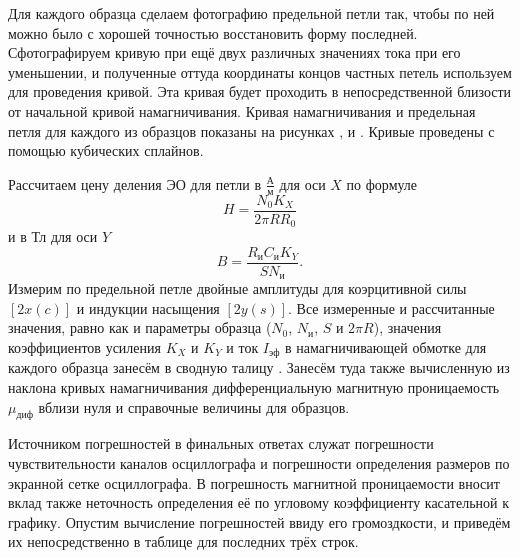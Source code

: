 \documentclass[a4paper,10pt]{article}
\begin{document}
Для каждого образца сделаем фотографию предельной петли так, чтобы по ней можно было с хорошей точностью восстановить форму последней. Сфотографируем кривую при ещё двух различных значениях тока при его уменьшении, и полученные оттуда координаты концов частных петель используем для проведения кривой. Эта кривая будет проходить в непосредственной близости от начальной кривой намагничивания. Кривая намагничивания и предельная петля для каждого из образцов показаны на рисунках ,  и . Кривые проведены с помощью кубических сплайнов.

Рассчитаем цену деления ЭО для петли в $\frac{\text{А}}{\text{м}}$ для оси $X$ по формуле\[H=\frac{N_0K_X}{2\pi RR_0}\]и в $\text{Тл}$ для оси $Y$ \[B=\frac{R_{\text{и}}C_{\text{и}}K_Y}{SN_{\text{и}}}.\]Измерим по предельной петле двойные амплитуды для коэрцитивной силы $\left[2x\left(c\right)\right]$ и индукции насыщения $\left[2y\left(s\right)\right]$. Все измеренные и рассчитанные значения, равно как и параметры образца ($N_0$, $N_{\text{и}}$, $S$ и $2\pi R$), значения коэффициентов усиления $K_X$ и $K_Y$ и ток $I_{\text{эф}}$ в намагничивающей обмотке для каждого образца занесём в сводную талицу . Занесём туда также вычисленную из наклона кривых намагничивания дифференциальную магнитную проницаемость $\mu_{\text{диф}}$ вблизи нуля и справочные величины для образцов.

Источником погрешностей в финальных ответах служат погрешности чувствительности каналов осциллографа и погрешности определения размеров по экранной сетке осциллографа. В погрешность магнитной проницаемости вносит вклад также неточность определения её по угловому коэффициенту касательной к графику. Опустим вычисление погрешностей ввиду его громоздкости, и приведём их непосредственно в таблице для последних трёх строк.
\end{document}
